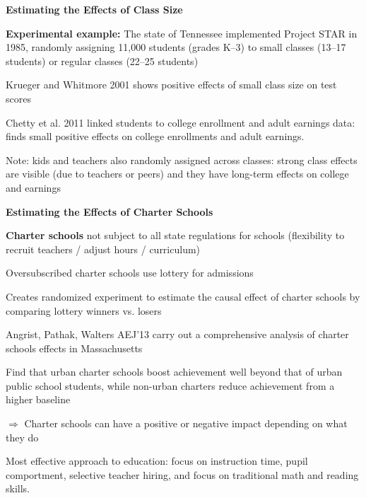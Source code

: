 \documentclass[landscape]{slides}
\begin{document}
\begin{slide}
\begin{center}
{\bf Estimating the Effects of Class Size}
\end{center}


\textbf{Experimental example:} The state of Tennessee implemented Project STAR in 1985, randomly assigning 11,000 students (grades K--3) to small classes (13--17 students) or regular classes (22--25 students)

Krueger and Whitmore 2001 shows positive effects of small class size on test scores

Chetty et al. 2011 linked students to college enrollment and adult earnings data: finds small positive effects on college
enrollments and adult earnings.

Note: kids and teachers also randomly assigned across classes: strong class effects are visible (due to teachers or peers) and they have long-term effects on college and earnings

\end{slide}

\begin{slide}
\begin{center}
{\bf Estimating the Effects of Charter Schools}
\end{center}


\textbf{Charter schools} not subject to all state regulations for schools (flexibility to recruit teachers / adjust hours / curriculum)

Oversubscribed charter schools use lottery for admissions

Creates randomized experiment to estimate the causal effect of charter schools
by comparing lottery winners vs. losers

Angrist, Pathak, Walters AEJ'13 carry out a comprehensive analysis of charter schools effects
in Massachusetts

Find that urban charter schools boost
achievement well beyond that of urban public school students, while non-urban charters
reduce achievement from a higher baseline

\small
$\Rightarrow$ Charter schools can have a positive or negative impact depending on what they
do

Most effective approach to education: focus on instruction time, pupil comportment,
selective teacher hiring, and focus on traditional
math and reading skills.

\end{slide}
\end{document}
